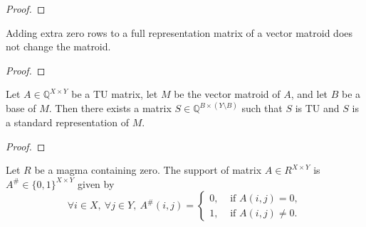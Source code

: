 \begin{proof}
    \leanok
    \SeeLean
\end{proof}




\begin{lemma}
    \label{Matrix.fromRows_zero_reindex_toMatroid}
    \leanok
    Adding extra zero rows to a full representation matrix of a vector matroid does not change the matroid.
\end{lemma}

\begin{proof}
    \leanok
    \SeeLean
\end{proof}

\begin{lemma}
    \label{VectorMatroid.exists_standardRepr_isBase_isTotallyUnimodular}
    \leanok
    Let $A \in \mathbb{Q}^{X \times Y}$ be a TU matrix, let $M$ be the vector matroid of $A$, and let $B$ be a base of $M$. Then there exists a matrix $S \in \mathbb{Q}^{B \times (Y \setminus B)}$ such that $S$ is TU and $S$ is a standard representation of $M$.
\end{lemma}

\begin{proof}
    \leanok
    \SeeLean
\end{proof}


\begin{definition}
    \label{Matrix.support}
    \leanok
    Let $R$ be a magma containing zero. The support of matrix $A \in R^{X \times Y}$ is $A^{\#} \in \{0, 1\}^{X \times Y}$ given by
    \[
        \forall i \in X, \ \forall j \in Y, \ A^{\#} (i, j) = \begin{cases}
            0, & \text{ if } A (i, j) = 0, \\
            1, & \text{ if } A (i, j) \neq 0.
        \end{cases}
    \]
\end{definition}

